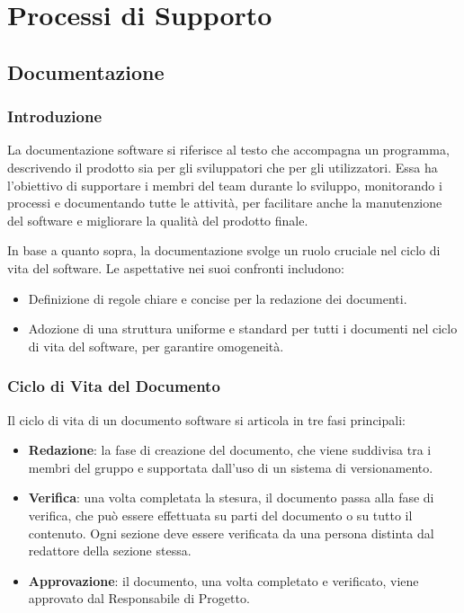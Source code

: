 \section{Processi di Supporto}




\subsection{Documentazione}
\subsubsection{Introduzione}
La documentazione software si riferisce al testo che accompagna un programma, 
descrivendo il prodotto sia per gli sviluppatori che per gli utilizzatori. 
Essa ha l'obiettivo di supportare i membri del team durante lo sviluppo, monitorando i 
processi e documentando tutte le attività, per facilitare anche la manutenzione del software 
e migliorare la qualità del prodotto finale.

In base a quanto sopra, la documentazione svolge un ruolo cruciale nel ciclo di vita del software. 
Le aspettative nei suoi confronti includono:
\begin{itemize}
    \item Definizione di regole chiare e concise per la redazione dei documenti.
    \item Adozione di una struttura uniforme e standard per tutti i documenti nel ciclo di vita del software, per garantire omogeneità.
\end{itemize}

\subsubsection{Ciclo di Vita del Documento}

Il ciclo di vita di un documento software si articola in tre fasi principali:
\begin{itemize}
    \item \textbf{Redazione}: la fase di creazione del documento, che viene suddivisa tra i membri del gruppo e supportata dall'uso di un sistema di versionamento.
    \item \textbf{Verifica}: una volta completata la stesura, il documento passa alla fase di verifica, 
    che può essere effettuata su parti del documento o su tutto il contenuto. 
    Ogni sezione deve essere verificata da una persona distinta dal redattore della sezione stessa.
    \item \textbf{Approvazione}: il documento, una volta completato e verificato, viene approvato dal Responsabile di Progetto.
\end{itemize}

